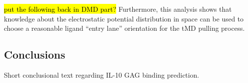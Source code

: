 \hl{put the following back in DMD part?}
Furthermore, this analysis shows that knowledge
about the electrostatic potential distribution in space can be used to choose a
reasonable ligand \enquote{entry lane} orientation for the tMD pulling process.


\subsection{Conclusions}
Short conclusional text regarding IL-10 GAG binding prediction.